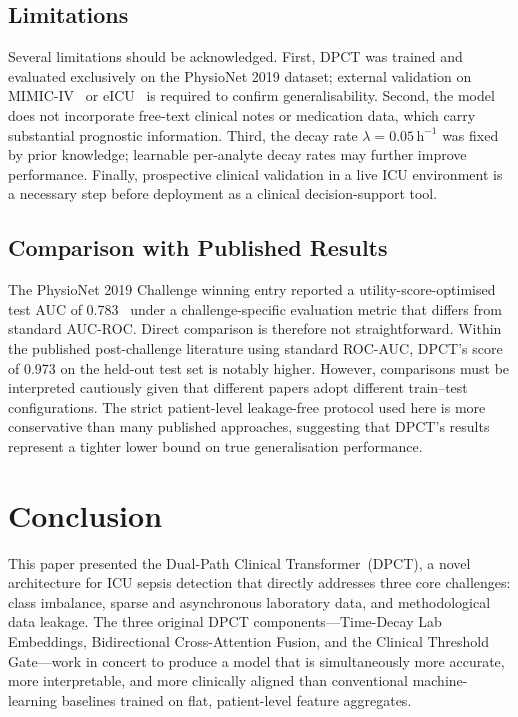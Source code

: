 \documentclass[conference,12pt]{IEEEtran}
\newcommand{\dpct}{\textsc{DPCT}}
\begin{document}
\subsection{\textbf{Limitations}}
\label{sec:disc:limits}

Several limitations should be acknowledged.
First, \dpct{} was trained and evaluated exclusively on the PhysioNet 2019
dataset; external validation on MIMIC-IV~\cite{johnson2023} or
eICU~\cite{pollard2018} is required to confirm generalisability.
Second, the model does not incorporate free-text clinical notes or medication
data, which carry substantial prognostic information.
Third, the decay rate $\lambda = 0.05\,\mathrm{h}^{-1}$ was fixed by prior
knowledge; learnable per-analyte decay rates may further improve performance.
Finally, prospective clinical validation in a live ICU environment is a
necessary step before deployment as a clinical decision-support tool.

\subsection{\textbf{Comparison with Published Results}}
\label{sec:disc:comparison}

The PhysioNet 2019 Challenge winning entry reported a utility-score-optimised
test AUC of 0.783~\cite{reyna2019} under a challenge-specific evaluation metric
that differs from standard AUC-ROC.
Direct comparison is therefore not straightforward.
Within the published post-challenge literature using standard ROC-AUC, \dpct{}'s
score of 0.973 on the held-out test set is notably higher.
However, comparisons must be interpreted cautiously given that different papers
adopt different train--test configurations.
The strict patient-level leakage-free protocol used here is more conservative
than many published approaches, suggesting that \dpct{}'s results represent a
tighter lower bound on true generalisation performance.

\section{\textbf{Conclusion}}
\label{sec:conclusion}

This paper presented the Dual-Path Clinical Transformer~(\dpct{}), a novel
architecture for ICU sepsis detection that directly addresses three core
challenges: class imbalance, sparse and asynchronous laboratory data, and
methodological data leakage.
The three original \dpct{} components---Time-Decay Lab Embeddings, Bidirectional
Cross-Attention Fusion, and the Clinical Threshold Gate---work in concert to
produce a model that is simultaneously more accurate, more interpretable, and
more clinically aligned than conventional machine-learning baselines trained on
flat, patient-level feature aggregates.
\end{document}
